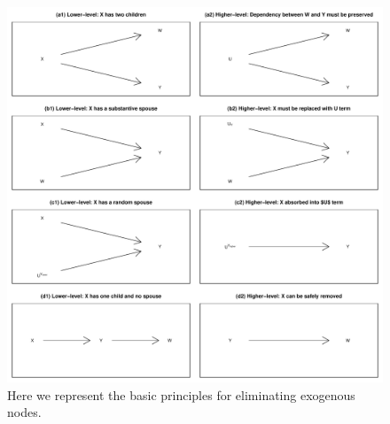 \documentclass[
  12pt,
]{book}
\begin{document}
\begin{figure}

{\centering \includegraphics[width=.5\textwidth]{ii_files/figure-latex/elimrules-1} 

}

\caption{Here we represent the basic principles for eliminating exogenous nodes.}\label{fig:elimrules}
\end{figure}
\end{document}
